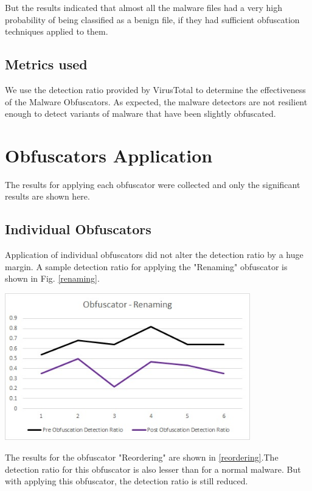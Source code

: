 But the results indicated that almost all the malware files had a very high probability of being classified as a benign file, if they had sufficient obfuscation techniques applied to them.

\subsection{Metrics used}
We use the detection ratio provided by VirusTotal to determine the effectiveness of the Malware Obfuscators. As expected, the malware detectors are not resilient enough to detect variants of malware that have been slightly obfuscated.

\section{Obfuscators Application}

The results for applying each obfuscator were collected and only the significant results are shown here.

\subsection{Individual Obfuscators}

Application of individual obfuscators did not alter the detection ratio by a huge margin. A sample detection ratio for applying the "Renaming" obfuscator is shown in Fig. \ref{renaming}.

	 \vspace{3mm}
	 \begin{center}
	 	\includegraphics[width=0.8\textwidth]{renaming.jpg}
	 	\label{renaming}
	 \end{center}
	 \vspace{3mm}
	 
The results for the obfuscator "Reordering" are shown in \ref{reordering}.The detection ratio for this obfuscator is also lesser than for a normal malware. But with applying this obfuscator, the detection ratio is still reduced. 
	 
